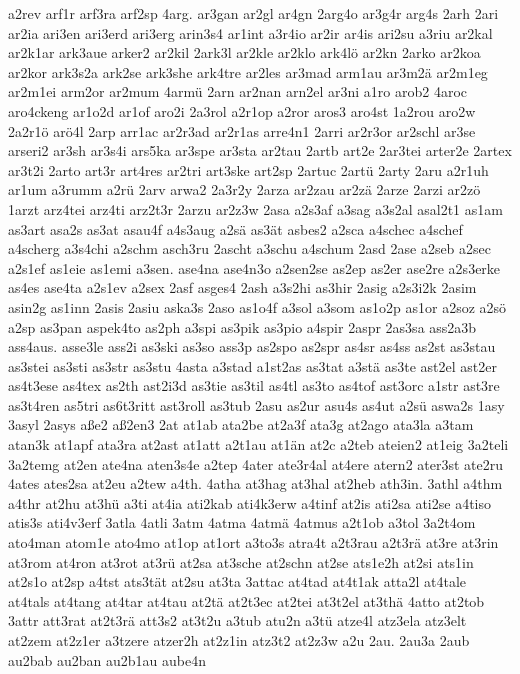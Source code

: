 {a2rev
arf1r
arf3ra
arf2sp
4arg.
ar3gan
ar2gl
ar4gn
2arg4o
ar3g4r
arg4s
2arh
2ari
ar2ia
ari3en
ari3erd
ari3erg
arin3s4
ar1int
a3r4io
ar2ir
ar4is
ari2su
a3riu
ar2kal
ar2k1ar
ark3aue
arker2
ar2kil
2ark3l
ar2kle
ar2klo
ark4lö
ar2kn
2arko
ar2koa
ar2kor
ark3s2a
ark2se
ark3she
ark4tre
ar2les
ar3mad
arm1au
ar3m2ä
ar2m1eg
ar2m1ei
arm2or
ar2mum
4armü
2arn
ar2nan
arn2el
ar3ni
a1ro
arob2
4aroc
aro4ckeng
ar1o2d
ar1of
aro2i
2a3rol
a2r1op
a2ror
aros3
aro4st
1a2rou
aro2w
2a2r1ö
arö4l
2arp
arr1ac
ar2r3ad
ar2r1as
arre4n1
2arri
ar2r3or
ar2schl
ar3se
arseri2
ar3sh
ar3s4i
ars5ka
ar3spe
ar3sta
ar2tau
2artb
art2e
2ar3tei
arter2e
2artex
ar3t2i
2arto
art3r
art4res
ar2tri
art3ske
art2sp
2artuc
2artü
2arty
2aru
a2r1uh
ar1um
a3rumm
a2rü
2arv
arwa2
2a3r2y
2arza
ar2zau
ar2zä
2arze
2arzi
ar2zö
1arzt
arz4tei
arz4ti
arz2t3r
2arzu
ar2z3w
2asa
a2s3af
a3sag
a3s2al
asal2t1
as1am
as3art
asa2s
as3at
asau4f
a4s3aug
a2sä
as3ät
asbes2
a2sca
a4schec
a4schef
a4scherg
a3s4chi
a2schm
asch3ru
2ascht
a3schu
a4schum
2asd
2ase
a2seb
a2sec
a2s1ef
as1eie
as1emi
a3sen.
ase4na
ase4n3o
a2sen2se
as2ep
as2er
ase2re
a2s3erke
as4es
ase4ta
a2s1ev
a2sex
2asf
asges4
2ash
a3s2hi
as3hir
2asig
a2s3i2k
2asim
asin2g
as1inn
2asis
2asiu
aska3s
2aso
as1o4f
a3sol
a3som
as1o2p
as1or
a2soz
a2sö
a2sp
as3pan
aspek4to
as2ph
a3spi
as3pik
as3pio
a4spir
2aspr
2as3sa
ass2a3b
ass4aus.
asse3le
ass2i
as3ski
as3so
ass3p
as2spo
as2spr
as4sr
as4ss
as2st
as3stau
as3stei
as3sti
as3str
as3stu
4asta
a3stad
a1st2as
as3tat
a3stä
as3te
ast2el
ast2er
as4t3ese
as4tex
as2th
ast2i3d
as3tie
as3til
as4tl
as3to
as4tof
ast3orc
a1str
ast3re
as3t4ren
as5tri
as6t3ritt
ast3roll
as3tub
2asu
as2ur
asu4s
as4ut
a2sü
aswa2s
1asy
3asyl
2asys
aße2
aß2en3
2at
at1ab
ata2be
at2a3f
ata3g
at2ago
ata3la
a3tam
atan3k
at1apf
ata3ra
at2ast
at1att
a2t1au
at1än
at2c
a2teb
ateien2
at1eig
3a2teli
3a2temg
at2en
ate4na
aten3s4e
a2tep
4ater
ate3r4al
at4ere
atern2
ater3st
ate2ru
4ates
ates2sa
at2eu
a2tew
a4th.
4atha
at3hag
at3hal
at2heb
ath3in.
3athl
a4thm
a4thr
at2hu
at3hü
a3ti
at4ia
ati2kab
ati4k3erw
a4tinf
at2is
ati2sa
ati2se
a4tiso
atis3s
ati4v3erf
3atla
4atli
3atm
4atma
4atmä
4atmus
a2t1ob
a3tol
3a2t4om
ato4man
atom1e
ato4mo
at1op
at1ort
a3to3s
atra4t
a2t3rau
a2t3rä
at3re
at3rin
at3rom
at4ron
at3rot
at3rü
at2sa
at3sche
at2schn
at2se
ats1e2h
at2si
ats1in
at2s1o
at2sp
a4tst
ats3tät
at2su
at3ta
3attac
at4tad
at4t1ak
atta2l
at4tale
at4tals
at4tang
at4tar
at4tau
at2tä
at2t3ec
at2tei
at3t2el
at3thä
4atto
at2tob
3attr
att3rat
at2t3rä
att3s2
at3t2u
a3tub
atu2n
a3tü
atze4l
atz3ela
atz3elt
at2zem
at2z1er
a3tzere
atzer2h
at2z1in
atz3t2
at2z3w
a2u
2au.
2au3a
2aub
au2bab
au2ban
au2b1au
aube4n
}
